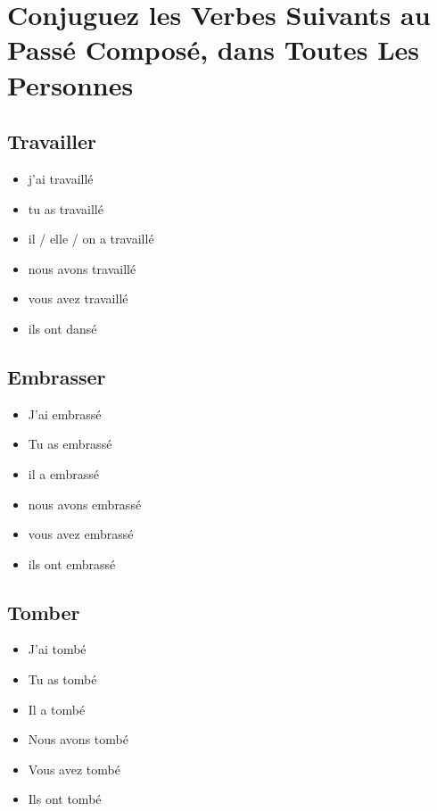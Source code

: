 \section{Conjuguez les Verbes Suivants au Passé Composé, dans Toutes Les Personnes}

\subsection{Travailler}

\begin{itemize}
    \item j'ai travaillé
    \item tu as travaillé
    \item il / elle / on a travaillé
    \item nous avons travaillé
    \item vous avez travaillé
    \item ils ont dansé
\end{itemize}

\subsection{Embrasser}

\begin{itemize}
    \item J'ai embrassé
    \item Tu as embrassé
    \item il a embrassé
    \item nous avons embrassé
    \item vous avez embrassé
    \item ils ont embrassé
\end{itemize}

\subsection{Tomber}

\begin{itemize}
    \item J'ai tombé
    \item Tu as tombé 
    \item Il a tombé
    \item Nous avons tombé 
    \item Vous avez tombé 
    \item Ils ont tombé
\end{itemize}

